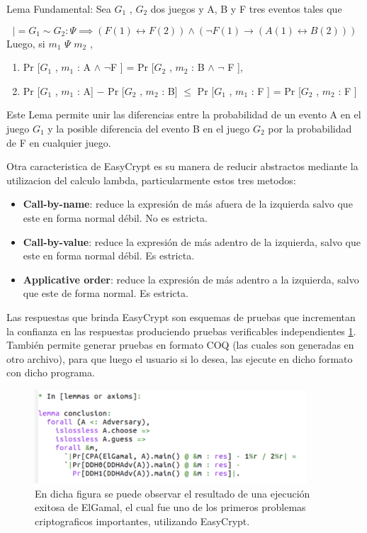 \documentclass[runningheads,a4paper]{llncs}
\begin{document}
\begin{lemma}{Lema Fundamental:}
Sea $G_1$ , $G_2$ dos juegos y A, B y F tres eventos tales que

\[|= G_1 ∼ G_2 : \Psi \implies (F(1) \leftrightarrow F(2)) \land (\neg F(1) \rightarrow (A(1) \leftrightarrow B(2)))\]
Luego, si $m_1$ $\Psi$ $m_2$ ,
\begin{enumerate}
	\item Pr [$G_1$ , $m_1$ : A $\land$ $\neg$F ] = Pr [$G_2$ , $m_2$ : B $\land$ $\neg$ F ],
	\item Pr [$G_1$ , $m_1$ : A] − Pr [$G_2$ , $m_2$ : B] $\leq$  Pr [$G_1$ , $m_1$ : F ] = Pr [$G_2$ , $m_2$ : F ]
\end{enumerate}
\end{lemma}

Este Lema permite unir las diferencias entre la probabilidad de un evento A en el juego $G_1$ y la posible diferencia del evento B en el juego $G_2$ por la probabilidad de F en cualquier juego.\cite{article4}


Otra caracteristica de EasyCrypt es su manera de reducir abstractos mediante la utilizacion del calculo lambda, particularmente estos tres metodos:

\begin{itemize}

	\item \textbf{Call-by-name}: reduce la expresión de más afuera de la izquierda salvo que este en forma normal débil. No es estricta.

	\item \textbf{Call-by-value}: reduce la expresión de más adentro de la izquierda, salvo que este en forma normal débil. Es estricta.

	\item \textbf{Applicative order}: reduce la expresión de más adentro a la izquierda, salvo que este de forma normal. Es estricta.
\end{itemize}

Las respuestas que brinda EasyCrypt son esquemas de pruebas que incrementan la confianza en las respuestas produciendo pruebas verificables independientes \ref{fig1}. También permite generar pruebas en formato COQ (las cuales son generadas en otro archivo), para que luego el usuario si lo desea, las ejecute en dicho formato con dicho programa.\cite{article4}

\begin{figure}
\includegraphics[width=\textwidth, height=3.5cm]{fig1.png}
\caption{En dicha figura se puede observar el resultado de una ejecución exitosa de ElGamal, el cual fue uno de los primeros problemas criptograficos importantes, utilizando EasyCrypt.} \label{fig1}
\end{figure}
\end{document}
